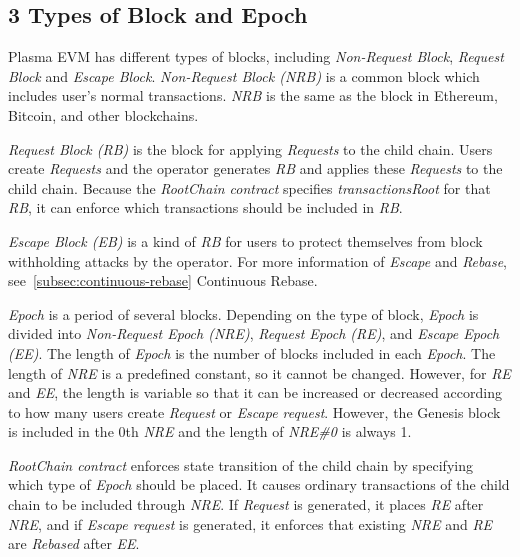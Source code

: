 \documentclass[letterpaper, 11pt]{article}
\begin{document}
\subsection{3 Types of Block and Epoch}
\begin{CJK}{UTF8}{mj}
Plasma EVM has different types of blocks, including \emph{Non-Request Block}, \emph{Request Block} and \emph{Escape Block}. \emph{Non-Request Block (NRB)} is a common block which includes user's normal transactions. \emph{NRB} is the same as the block in Ethereum, Bitcoin, and other blockchains.

\emph{Request Block (RB)} is the block for applying \emph{Requests} to the child chain. Users create \emph{Requests} and the operator generates \emph{RB} and applies these \emph{Requests} to the child chain. Because the \emph{RootChain contract} specifies \emph{transactionsRoot} for that \emph{RB}, it can enforce which transactions should be included in \emph{RB}.

\emph{Escape Block (EB)} is a kind of \emph{RB} for users to protect themselves from block withholding attacks by the operator. For more information of \emph{Escape} and \emph{Rebase}, see~\ref{subsec:continuous-rebase} Continuous Rebase.

\bigskip

\emph{Epoch} is a period of several blocks. Depending on the type of block, \emph{Epoch} is divided into \emph{Non-Request Epoch (NRE)}, \emph{Request Epoch (RE)}, and \emph{Escape Epoch (EE)}. The length of \emph{Epoch} is the number of blocks included in each \emph{Epoch}. The length of \emph{NRE} is a predefined constant, so it cannot be changed. However, for \emph{RE} and \emph{EE}, the length is variable so that it can be increased or decreased according to how many users create \emph{Request} or \emph{Escape request}. However, the Genesis block is included in the 0th \emph{NRE} and the length of \emph{NRE\#0} is always 1.

\emph{RootChain contract} enforces state transition of the child chain by specifying which type of \emph{Epoch} should be placed. It causes ordinary transactions of the child chain to be included through \emph{NRE}. If \emph{Request} is generated, it places \emph{RE} after \emph{NRE}, and if \emph{Escape request} is generated, it enforces that existing \emph{NRE} and \emph{RE} are \emph{Rebased} after \emph{EE}.
\end{CJK}
\end{document}
